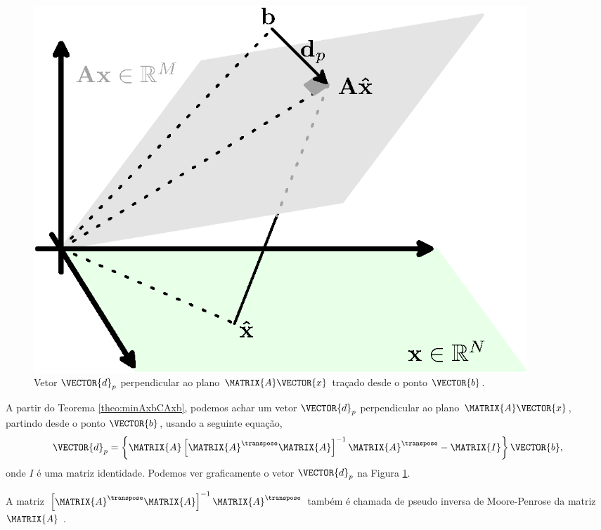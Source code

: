 \begin{corollary} 
\label{coro:minAxbCAxb1} ~

\noindent
\begin{minipage}{0.49\textwidth}
\centering
\begin{minipage}{0.90\textwidth}
     \begin{figure}[H]
         \centering
         \includegraphics[width=0.9\textwidth]{chapters/minimization-fx/minimo-linear1.eps}
         \caption{Vetor $\VECTOR{d}_p$ perpendicular ao plano 
$\MATRIX{A}\VECTOR{x}$ traçado desde o ponto $\VECTOR{b}$. }
         \label{fig:coro:minAxbCAxb1:a}
     \end{figure}
\end{minipage}
\end{minipage}
\begin{minipage}{0.49\textwidth}
A partir do Teorema \ref{theo:minAxbCAxb}, 
podemos achar um vetor $\VECTOR{d}_p$ perpendicular ao plano $\MATRIX{A}\VECTOR{x}$,
partindo desde o ponto $\VECTOR{b}$, usando a seguinte equação,
\begin{equation}
\VECTOR{d}_p = \left\{\MATRIX{A}\left[ \MATRIX{A}^{\transpose}\MATRIX{A} \right]^{-1}\MATRIX{A}^{\transpose}- \MATRIX{I}\right\}\VECTOR{b},
\end{equation}
onde $I$ é uma matriz identidade.
Podemos ver graficamente o vetor $\VECTOR{d}_p$ na Figura \ref{fig:coro:minAxbCAxb1:a}.
\begin{tcbattention}
A matriz $\left[ \MATRIX{A}^{\transpose}\MATRIX{A} \right]^{-1}\MATRIX{A}^{\transpose}$
também é chamada de pseudo inversa de Moore-Penrose da matriz $\MATRIX{A}$ \cite[pp. 290]{golub2013matrix}.
\end{tcbattention}
\end{minipage}
\end{corollary}

